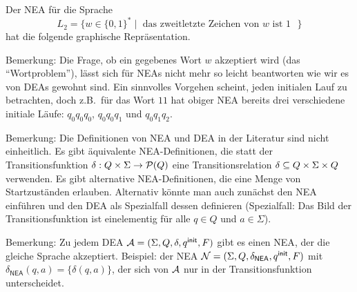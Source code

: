 \begin{Bsp}
\label{bsp:2.zweitletztes} Der \acs*{NEA} für die Sprache 
$$L_2=\{w\in\{0,1\}^*\mid \text{ das zweitletzte Zeichen von $w$ ist $1$ }\}$$ hat die folgende graphische Repräsentation.
  \begin{center}
  \end{center}
\end{Bsp}


Bemerkung: Die Frage, ob ein gegebenes Wort $w$ akzeptiert wird (das "`Wortproblem"'), lässt sich für \acs*{NEA}s nicht mehr so leicht beantworten wie wir es von \acs*{DEA}s gewohnt sind.
Ein sinnvolles Vorgehen scheint, jeden initialen Lauf zu betrachten, doch z.B.\ für das Wort $11$ hat obiger \acs*{NEA} bereits  drei verschiedene initiale Läufe: $q_0q_0q_0$, $q_0q_0q_1$ und $q_0q_1q_2$.


Bemerkung: Die Definitionen von \ac{NEA} und \ac{DEA} in der Literatur sind nicht einheitlich. 
Es gibt äquivalente \ac{NEA}-Definitionen, die statt der Transitionsfunktion $\delta:Q\x\Sigma\->\mathcal{P}(Q)$ eine Transitionsrelation $\delta\subseteq Q\times\Sigma\times Q$ verwenden.
Es gibt alternative \ac{NEA}-Definitionen, die eine Menge von Startzuständen erlauben.
Alternativ könnte man auch zunächst den \ac{NEA} einführen und den \ac{DEA} als Spezialfall dessen definieren (Spezialfall: Das Bild der Transitionsfunktion ist einelementig für alle $q\in Q$ und $a\in\Sigma$).

Bemerkung: Zu jedem \ac{DEA} $\mathcal{A}= (\Sigma, Q,\delta,q^\mathsf{init},F)$ gibt es einen \ac{NEA}, der die gleiche Sprache akzeptiert.
Beispiel: der \ac{NEA} $\mathcal{N}= (\Sigma, Q,\delta_\mathsf{NEA},q^\mathsf{init},F)$ mit $\delta_\mathsf{NEA}(q,a)=\{\delta(q,a)\}$, der sich von $\mathcal{A}$ nur in der Transitionsfunktion unterscheidet.



